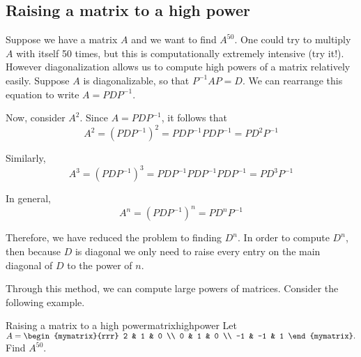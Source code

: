 \subsection{Raising a matrix to a high power}

Suppose we have a matrix $A$ and we want to find $A^{50}$. One could
try to multiply $A$ with itself 50 times, but this is computationally
extremely intensive (try it!). However diagonalization allows us to
compute high powers of a matrix relatively easily.  Suppose $A$ is
diagonalizable, so that $P^{-1}AP=D$. We can rearrange this equation
to write $A=PDP^{-1}$.

Now, consider $A^{2}$. Since $A=PDP^{-1}$, it follows that 
\begin{equation*}
A^{2} = \left( PDP^{-1}\right) ^{2}=PDP^{-1}PDP^{-1}=PD^{2}P^{-1}
\end{equation*}

Similarly, 
\begin{equation*}
A^3 = \left( PDP^{-1}\right) ^{3}=PDP^{-1}PDP^{-1}PDP^{-1}=PD^{3}P^{-1}
\end{equation*}

In general,
\begin{equation*}
A^n = \left( PDP^{-1}\right) ^{n}=PD^{n}P^{-1}
\end{equation*}

Therefore, we have reduced the problem to finding $D^{n}$. In order to
compute $D^{n}$, then because $D$ is diagonal we only need to raise
every entry on the main diagonal of $D$ to the power of $n$.

Through this method, we can compute large powers of matrices. Consider the following example.

\begin{example}{Raising a matrix to a high power}{matrixhighpower}
Let
  $A=\begin{mymatrix}{rrr}
2 & 1 & 0 \\
0 & 1 & 0 \\
-1 & -1 & 1
\end{mymatrix}. $ Find $A^{50}.$
\end{example}

